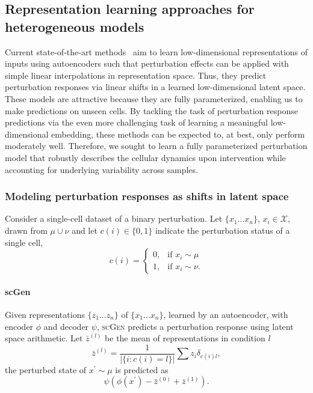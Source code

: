 \subsection{Representation learning approaches for heterogeneous models}  %
Current state-of-the-art methods~\citep{lopez2018, lotfollahi2019, yang2020} aim to learn low-dimensional representations of inputs using autoencoders such that perturbation effects can be applied with simple linear interpolations in representation space. Thus, they predict perturbation responses via linear shifts in a learned low-dimensional latent space. These models are attractive because they are fully parameterized, enabling us to make predictions on unseen cells. By tackling the task of perturbation response predictions via the even more challenging task of learning a meaningful low-dimensional embedding, these methods can be expected to, at best, only perform moderately well. Therefore, we sought to learn a fully parameterized perturbation model that robustly describes the cellular dynamics upon intervention while accounting for underlying variability across samples.

\subsubsection{Modeling perturbation responses as shifts in latent space}
Consider a single-cell dataset of a binary perturbation.
Let $\{x_1 \ldots x_n\}$, $x_i \in \mathcal{X}$, drawn from $\mu \cup \nu$
and let $c(i) \in \{0, 1\}$ indicate the perturbation status of a single cell,
\[
    c(i) = 
\begin{cases}
    0, & \text{if } x_i \sim \mu \\
    1, & \text{if } x_i \sim \nu.
\end{cases}
\]

\paragraph{scGen}
Given representations $\{z_1 \ldots z_n \}$ of $\{x_1 \ldots x_n\}$, learned by an autoencoder, with encoder $\phi$ and decoder $\psi$,
\textsc{scGen} \citep{lotfollahi2019} predicts a perturbation response using latent space arithmetic.
Let $\bar{z}^{(l)}$ be the mean of representations in condition $l$
\begin{equation*}
    \bar{z}^{(l)} = \frac{1}{|\{i: c(i) = l\}|} \sum{z_i \delta_{c(i)l}},
\end{equation*}
the perturbed state of $x^\prime \sim \mu$ is predicted as
\begin{equation*}
    \psi(\phi(x^\prime) - \bar{z}^{(0)} + \bar{z}^{(1)}).
\end{equation*}

